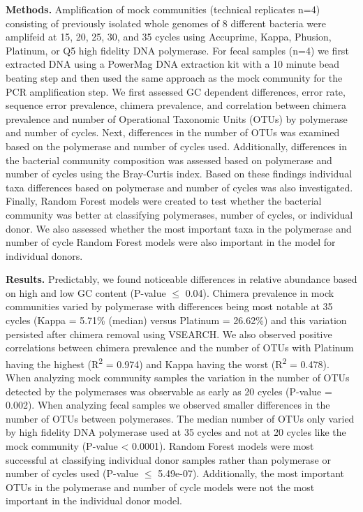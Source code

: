\documentclass[11pt,]{article}
\begin{document}
\textbf{Methods.} Amplification of mock communities (technical
replicates n=4) consisting of previously isolated whole genomes of 8
different bacteria were amplifeid at 15, 20, 25, 30, and 35 cycles using
Accuprime, Kappa, Phusion, Platinum, or Q5 high fidelity DNA polymerase.
For fecal samples (n=4) we first extracted DNA using a PowerMag DNA
extraction kit with a 10 minute bead beating step and then used the same
approach as the mock community for the PCR amplification step. We first
assessed GC dependent differences, error rate, sequence error
prevalence, chimera prevalence, and correlation between chimera
prevalence and number of Operational Taxonomic Units (OTUs) by
polymerase and number of cycles. Next, differences in the number of OTUs
was examined based on the polymerase and number of cycles used.
Additionally, differences in the bacterial community composition was
assessed based on polymerase and number of cycles using the Bray-Curtis
index. Based on these findings individual taxa differences based on
polymerase and number of cycles was also investigated. Finally, Random
Forest models were created to test whether the bacterial community was
better at classifying polymerases, number of cycles, or individual
donor. We also assessed whether the most important taxa in the
polymerase and number of cycle Random Forest models were also important
in the model for individual donors.

\textbf{Results.} Predictably, we found noticeable differences in
relative abundance based on high and low GC content (P-value
\(\leqslant\) 0.04). Chimera prevalence in mock communities varied by
polymerase with differences being most notable at 35 cycles (Kappa =
5.71\% (median) versus Platinum = 26.62\%) and this variation persisted
after chimera removal using VSEARCH. We also observed positive
correlations between chimera prevalence and the number of OTUs with
Platinum having the highest (R\textsuperscript{2} = 0.974) and Kappa
having the worst (R\textsuperscript{2} = 0.478). When analyzing mock
community samples the variation in the number of OTUs detected by the
polymerases was observable as early as 20 cycles (P-value = 0.002). When
analyzing fecal samples we observed smaller differences in the number of
OTUs between polymerases. The median number of OTUs only varied by high
fidelity DNA polymerase used at 35 cycles and not at 20 cycles like the
mock community (P-value \textless{} 0.0001). Random Forest models were
most successful at classifying individual donor samples rather than
polymerase or number of cycles used (P-value \(\leqslant\) 5.49e-07).
Additionally, the most important OTUs in the polymerase and number of
cycle models were not the most important in the individual donor model.
\end{document}
